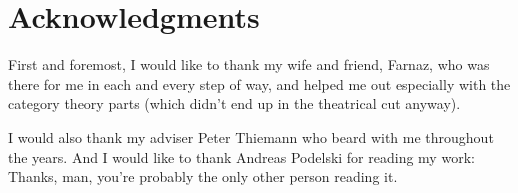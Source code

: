 \chapter{Acknowledgments}

First and foremost, I would like to thank my wife and friend, Farnaz, who was there for me in each and every step of way, and helped me out especially with the category theory parts (which didn't end up in the theatrical cut anyway).

I would also thank my adviser Peter Thiemann who beard with me throughout the years. And I would like to thank Andreas Podelski for reading my work: Thanks, man, you're probably the only other person reading it.